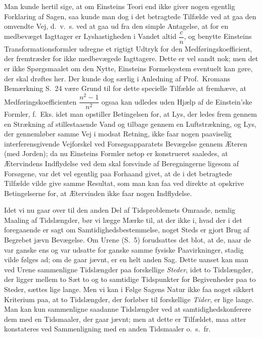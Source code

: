 \documentclass[12pt,a4paper]{article}
\newcommand{\opage}[1]{\marginnote{\footnotesize\textit{[#1]}}}
\begin{document}
Man kunde hertil sige, at om Einsteins Teori end ikke giver nogen egentlig
Forklaring af Sagen, saa kunde man dog i det betragtede Tilfælde ved at gaa den
omvendte Vej, d.~v.~s. ved at gaa ud fra den simple Antagelse, at for en
medbevæget Iagttager er Lyshastigheden i Vandet altid $\dfrac{c}{n}$, og
benytte Einsteins Transformationsformler udregne et rigtigt Udtryk for den
Medføringskoefficient, der fremtræder for ikke medbevægede Iagttagere. Dette er
vel sandt nok; men det er ikke Spørgsmaalet om den Nytte, Einsteins
Formelsystem eventuelt kan gøre, der skal drøftes her. Der kunde dog særlig i
Anledning af Prof.\ Kromans Bemærkning S.~24 være Grund til for dette specielle
Tilfælde at fremhæve, at Medføringskoefficienten $\dfrac{n^{2}-1}{n^{2}}$ ogsaa
kan udledes uden Hjælp af de Einstein'ske Formler, f.~Eks. idet man opstiller
Betingelsen for, at Lys, der ledes frem gennem en Strækning af stillestaaende
Vand og tilbage gennem en Luftstrækning, og Lys, der gennemløber samme Vej i
modsat Retning, ikke faar nogen paaviselig interferensgivende Vejforskel ved
Forsøgsapparatets Bevægelse gennem Æteren (med Jorden); da nu Einsteins Formler
netop er konstrueret saaledes, at \guillemotright
Ætervindens\guillemotleft{} Indflydelse ved dem skal forsvinde af
Beregningerne ligesom af Forsøgene, var det vel egentlig paa Forhaand givet, at
de i det betragtede Tilfælde vilde give samme Resultat, som man kan faa ved
direkte at opskrive Betingelserne for, at Ætervinden ikke faar nogen
Indflydelse.

Idet vi nu gaar over til den anden Del af Tidsproblemets Omraade, nemlig
Maaling af Tidslængder, bør vi lægge Mærke til, at der ikke i, hvad der i det
foregaaende er sagt om Samtidighedsbestemmelse, noget Steds er gjort Brug af
Begrebet jævn Bevægelse. Om Urene (S.~5) forudsattes det blot, at de, naar de
var ganske ens og var udsatte for ganske samme fysiske Paavirkninger, stadig
vilde følges ad; om de gaar jævnt, er en helt anden Sag. Dette uanset kan man
ved Urene sammenligne Tidslængder paa forskellige \emph{Steder}, idet to
Tidslængder, der ligger mellem to Sæt to og to
\opage{11} samtidige Tidspunkter for Begivenheder paa to Steder, sættes lige lange. Men vi
kan i Følge Sagens Natur ikke faa noget sikkert Kriterium paa, at to
Tidslængder, der forløber til forskellige \emph{Tider}, er lige lange. Man kan
kun sammenligne saadanne Tidslængder ved at \guillemotright
samtidighedskonferere\guillemotleft{} dem med en Tidsmaaler, der gaar jævnt;
men at dette er Tilfældet, maa atter konstateres ved Sammenligning med en anden
Tidsmaaler o.~s.~fr.
\end{document}
